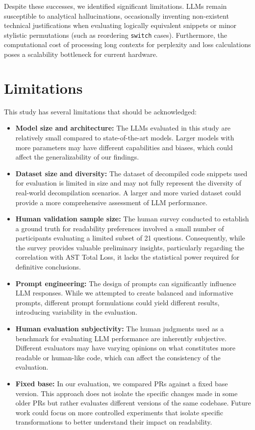 Despite these successes, we identified significant limitations. \acp{LLM} remain susceptible to analytical hallucinations, occasionally inventing non-existent technical justifications when evaluating logically equivalent snippets or minor stylistic permutations (such as reordering \texttt{switch} cases). Furthermore, the computational cost of processing long contexts for perplexity and loss calculations poses a scalability bottleneck for current hardware.

\section{Limitations}

This study has several limitations that should be acknowledged:
\begin{itemize}
    \item \textbf{Model size and architecture:} The \acp{LLM} evaluated in this study are relatively small compared to state-of-the-art models. Larger models with more parameters may have different capabilities and biases, which could affect the generalizability of our findings.
    \item \textbf{Dataset size and diversity:} The dataset of decompiled code snippets used for evaluation is limited in size and may not fully represent the diversity of real-world decompilation scenarios. A larger and more varied dataset could provide a more comprehensive assessment of \ac{LLM} performance.
    \item \textbf{Human validation sample size:} The human survey conducted to establish a ground truth for readability preferences involved a small number of participants evaluating a limited subset of 21 questions. Consequently, while the survey provides valuable preliminary insights, particularly regarding the correlation with \ac{AST} Total Loss, it lacks the statistical power required for definitive conclusions.
    \item \textbf{Prompt engineering:} The design of prompts can significantly influence \ac{LLM} responses. While we attempted to create balanced and informative prompts, different prompt formulations could yield different results, introducing variability in the evaluation.
    \item \textbf{Human evaluation subjectivity:} The human judgments used as a benchmark for evaluating \ac{LLM} performance are inherently subjective. Different evaluators may have varying opinions on what constitutes more readable or human-like code, which can affect the consistency of the evaluation.
    \item \textbf{Fixed base:} In our evaluation, we compared PRs against a fixed base version. This approach does not isolate the specific changes made in some older \acp{PR} but rather evaluates different versions of the same codebase. Future work could focus on more controlled experiments that isolate specific transformations to better understand their impact on readability.
\end{itemize}

